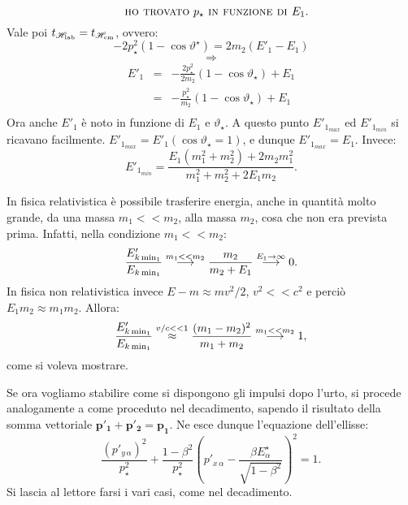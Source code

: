 $$\quad\mbox{\textsc{ho trovato} } p_{\star} \mbox{ \textsc{in funzione di
}} E_1.
$$
Vale poi $t_{\mathscr{H}_{\mathrm{lab}}}=t_{\mathscr{H}_{\mathrm{cm}}}$, ovvero:
$$
-2 p_{\star}^2 (1 - \cos\vartheta^{\star}) = 2 m_2 (E'_1 - E_1)
$$
$$
\Longrightarrow
$$
\begin{eqnarray*}
E'_1 & = & -\frac{2 p_{\star}^2}{2 m_2} (1-\cos \vartheta_{\star})
+ E_1\\
& = & -\frac{ p_{\star}^2}{ m_2} (1-\cos \vartheta_{\star}) + E_1\\
\end{eqnarray*}
Ora anche $E'_1$ \`e noto in funzione di $E_1$ e
$\vartheta_{\star}$. A questo punto $E'_{1_{max}}$ ed
$E'_{1_{min}}$ si ricavano facilmente. $E'_{1_{max}}= E'_1(\cos
\vartheta_{\star} = 1)$, e dunque $E'_{1_{max}}= E_1$. Invece:
$$
E'_{1_{min}} = \frac{E_1 (m_1^2 + m_2^2) + 2 m_2 m_1^2}{m_1^2 +
m_2^2 + 2 E_1 m_2}.
$$
\begin{observazione}
In fisica relativistica \`e possibile trasferire energia, anche in
quantit\`a molto grande, da una massa $m_1<<m_2$, alla massa
$m_2$, cosa che non era prevista prima. Infatti, nella condizione
$m_1<<m_2$:
$$
\frac{E'_{k\,\mathrm{min}_1}}{E_{k\,\mathrm{min}_1}}
\stackrel{m_1<<m_2}{\longrightarrow} \frac{m_2}{m_2 + E_1}
\stackrel{E_1 \rightarrow \infty}{\longrightarrow} 0.
$$
In fisica non relativistica invece $E - m \approx m v^2 / 2$,
$v^2<<c^2$ e perci\`o $E_1 m_2 \approx m_1 m_2$. Allora:
$$
\frac{E'_{k\,\mathrm{min}_1}}{E_{k\,\mathrm{min}_1}} \stackrel{v/c
<<1}{\approx} \frac{(m_1-m_2)^2}{m_1 + m_2} \stackrel{m_1 <<
m_2}{\longrightarrow} 1,
$$
come si voleva mostrare.
\end{observazione}
Se ora vogliamo stabilire come si dispongono gli impulsi dopo
l'urto, si procede analogamente a come proceduto nel decadimento,
sapendo il risultato della somma vettoriale $\mathbf{p'_1} +
\mathbf{p'_2} = \mathbf{p_1}$.
\newline
Ne esce dunque l'equazione dell'ellisse:
$$
\frac{ (p'_{y\,\alpha})^2 }{ p_{\star}^2 } + \frac{ 1- \beta^2 }{
p_{\star}^2 } \left( p'_{x\,\alpha} - \frac{ \beta
E_{\alpha}^{\star} }{ \sqrt{ 1 - \beta^2} }\right)^2 = 1.
$$
Si lascia al lettore farsi i vari casi, come nel decadimento.







%
